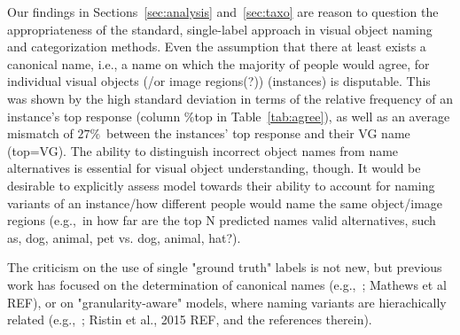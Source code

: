 
Our findings in Sections~\ref{sec:analysis} and~\ref{sec:taxo} are reason to question the appropriateness of the standard, single-label approach in visual object naming and categorization methods. 
Even the assumption that there at least exists a canonical name, i.e., a  name on which the majority of people would agree, for individual visual objects (/or image regions(?)) (instances) is disputable. 
This was shown by the high standard deviation in terms of the relative frequency of an instance's top response (column \%top in Table~\ref{tab:agree}), as well as an average mismatch of $27\%$~between the instances' top response and their VG name (\mbox{top=VG}). 
%
The ability to distinguish incorrect object names from name alternatives is essential for visual object understanding, though. 
It would be desirable to explicitly assess model towards their ability to account for naming variants of an instance/how different people would name the same object/image regions (e.g.,~in how far are the top N predicted names valid alternatives, such as, dog, animal, pet vs. dog, animal, hat?). 
%

The criticism on the use of single "ground truth" labels is not new, but %
previous work has focused on the determination of canonical names (e.g.,~; Mathews et al REF), or on "granularity-aware" models, where naming variants are hierachically related (e.g.,~; Ristin et al., 2015 REF, and the references therein). 

